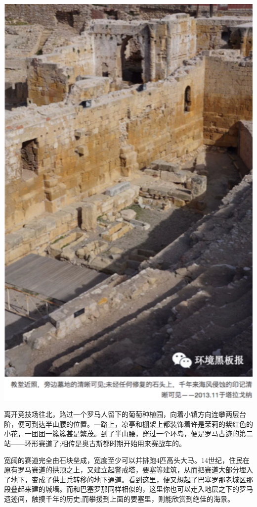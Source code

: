 \documentclass[]{book}
\begin{document}
\includegraphics[width=5.24in]{images/xt31}

离开竞技场往北，路过一个罗马人留下的葡萄种植园，向着小镇方向连攀两层台阶，便可到达半山腰的位置。一路上，凉亭和棚架上都装饰着许是茉莉的紫红色的小花，一团团一簇簇甚是繁茂。到了半山腰，穿过一个环岛，便是罗马古迹的第二站------环形赛道了;相传是奥古斯都时期开始用来赛战车的。

宽阔的赛道完全由石块垒成，宽度至少可以并排跑4匹高头大马。14世纪，住民在原有罗马赛道的拱顶之上，又建立起警戒塔，要塞等建筑，从而把赛道大部分埋入了地下，变成了供士兵转移的地下通道。看到这里，便又想起了巴塞罗那老城区那段叠起来建的城墙。而和巴塞罗那同样相似的，这里你也可以走入地层之下的罗马遗迹间，触摸千年的历史;而攀援到上面的要塞里，则能欣赏到绝佳的海景。
\end{document}
